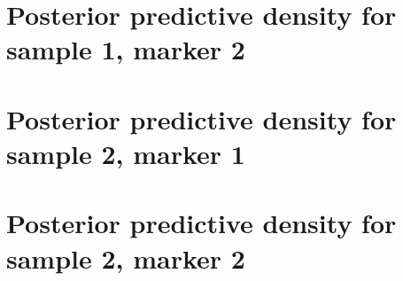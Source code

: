 \documentclass[10pt]{article} %
\begin{document}
\newpage
\section{Posterior predictive density for sample 1, marker 2}
\begin{figure}[H]
  \begin{center}  %
  \end{center}
\end{figure}

\newpage
\section{Posterior predictive density for sample 2, marker 1}
\begin{figure}[H]
  \begin{center}  %
  \end{center}
\end{figure}

\newpage
\section{Posterior predictive density for sample 2, marker 2}
\begin{figure}[H]
  \begin{center}  %
  \end{center}
\end{figure}


% 
\end{document}

